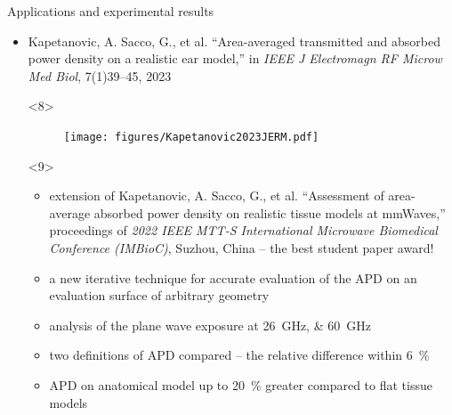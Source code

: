 \documentclass[xcolor=dvipsnames,10pt]{beamer}
\begin{document}
\begin{frame}{Applications and experimental results}
\begin{onlyenv}
\begin{itemize}
\begin{onlyenv}
\begin{figure}
                \end{figure}
            \end{onlyenv}
            \begin{onlyenv}<7>
                \begin{itemize}
                    \item IPD spatially averaged over the spherical and cylindrical surface computed at \SIrange[]{6}{90}{\GHz}
                    \item high frequencies $\rightarrow$ numerical artifacts during computational EM modeling
                    \item machine learning and its associated tooling (automatic differentiation) $+$ traditional scientific computing $=$ differentiable programming $\rightarrow$ elimination of numerical artifacts and computational speed-up
                    \item curvature of non-planar models -- strong positive association with larger values of spatially averaged IPD
                \end{itemize}
            \end{onlyenv}
            \item<only@8,9> Kapetanovic, A. Sacco, G., et al. ``Area-averaged transmitted and absorbed power density on a realistic ear model,'' in \textit{IEEE J Electromagn RF Microw Med Biol}, 7(1)39--45, 2023
            \begin{onlyenv}<8>
                \begin{figure}
                    \centering
                    \texttt{[image: figures/Kapetanovic2023JERM.pdf]}
                \end{figure}
            \end{onlyenv}
            \begin{onlyenv}<9>
                \begin{itemize}
                    \item extension of Kapetanovic, A. Sacco, G., et al. ``Assessment of area-average absorbed power density on realistic tissue models at mmWaves,'' proceedings of \textit{2022 IEEE MTT-S International Microwave Biomedical Conference (IMBioC)}, Suzhou, China -- the best student paper award!
                    \item a new iterative technique for accurate evaluation of the APD on an evaluation surface of arbitrary geometry
                    \item analysis of the plane wave exposure at \SIlist{26;60}{\GHz}
                    \item two definitions of APD compared -- the relative difference within \SI{6}{\percent}
                    \item APD on anatomical model up to \SI{20}{\percent} greater compared to flat tissue models
                \end{itemize}
            \end{onlyenv}
        \end{itemize}
    \end{onlyenv}
\end{frame}
\end{document}
